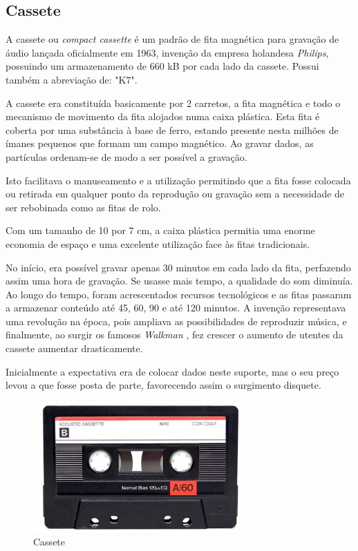 \documentclass{report}
\begin{document}
\newpage
		
		\subsection{Cassete}	
	A cassete ou \textit{compact cassette}  é um padrão de fita magnética para gravação de áudio lançada oficialmente em 1963, invenção da empresa holandesa \textit{Philips}, possuindo um armazenamento de 660 kB por cada lado da cassete. Possui também a abreviação de: "K7".
\vspace{1mm}
	
	A cassete era constituída basicamente por 2 carretos, a fita magnética e todo o mecanismo de movimento da fita alojados numa caixa plástica. Esta fita é coberta por uma substância à base de ferro, estando presente nesta milhões de ímanes pequenos que formam um campo magnético. Ao gravar dados, as partículas ordenam-se de modo a ser possível a gravação.
\vspace{1mm}

	Isto facilitava o manuseamento e a utilização permitindo que a fita fosse colocada ou retirada em qualquer ponto da reprodução ou gravação sem a necessidade de ser rebobinada como as fitas de rolo. 
\vspace{1mm}
	
	Com um tamanho de 10 por 7 cm, a caixa plástica permitia uma enorme economia de espaço e uma excelente utilização face às fitas tradicionais.
\vspace{1mm}

	No início, era possível gravar apenas 30 minutos em cada lado da fita, perfazendo assim uma hora de gravação. Se usasse mais tempo, a qualidade do som diminuía. Ao longo do tempo, foram acrescentados recursos tecnológicos e as fitas passaram a armazenar conteúdo até 45, 60, 90 e até 120 minutos. A invenção representava uma revolução na época, pois ampliava as possibilidades de reproduzir música, e finalmente, ao surgir os famosos \textit{Walkman}  , fez crescer o aumento de utentes da cassete aumentar drasticamente.
\vspace{1mm}

	Inicialmente a expectativa era de colocar dados neste suporte, mas o seu preço levou a que fosse posta de parte, favorecendo assim o surgimento disquete.
	
	\begin{figure} [h]
		\centering
		\includegraphics[width=8.19cm, height=5cm]{cassete.jpg}
		\caption{Cassete}
	\end{figure}		
		
\end{document}
